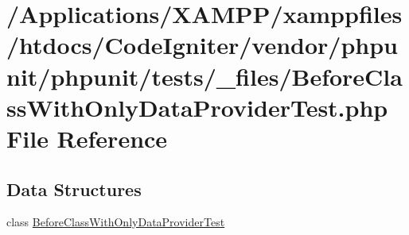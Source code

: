 \hypertarget{_before_class_with_only_data_provider_test_8php}{}\section{/\+Applications/\+X\+A\+M\+P\+P/xamppfiles/htdocs/\+Code\+Igniter/vendor/phpunit/phpunit/tests/\+\_\+files/\+Before\+Class\+With\+Only\+Data\+Provider\+Test.php File Reference}
\label{_before_class_with_only_data_provider_test_8php}
\subsection*{Data Structures}
\begin{DoxyCompactItemize}
\item 
class \mbox{\hyperlink{class_before_class_with_only_data_provider_test}{Before\+Class\+With\+Only\+Data\+Provider\+Test}}
\end{DoxyCompactItemize}
